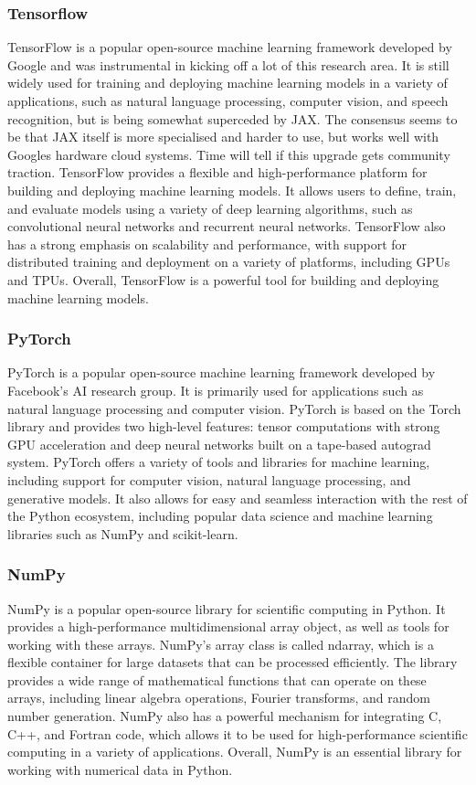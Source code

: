 \subsubsection{Tensorflow}
TensorFlow is a popular open-source machine learning framework developed by Google and was instrumental in kicking off a lot of this research area. It is still widely used for training and deploying machine learning models in a variety of applications, such as natural language processing, computer vision, and speech recognition, but is being somewhat superceded by JAX. The consensus seems to be that JAX itself is more specialised and harder to use, but works well with Googles hardware cloud systems. Time will tell if this upgrade gets community traction. TensorFlow provides a flexible and high-performance platform for building and deploying machine learning models. It allows users to define, train, and evaluate models using a variety of deep learning algorithms, such as convolutional neural networks and recurrent neural networks. TensorFlow also has a strong emphasis on scalability and performance, with support for distributed training and deployment on a variety of platforms, including GPUs and TPUs. Overall, TensorFlow is a powerful tool for building and deploying machine learning models.
\subsubsection{PyTorch}
PyTorch is a popular open-source machine learning framework developed by Facebook's AI research group. It is primarily used for applications such as natural language processing and computer vision. PyTorch is based on the Torch library and provides two high-level features: tensor computations with strong GPU acceleration and deep neural networks built on a tape-based autograd system. PyTorch offers a variety of tools and libraries for machine learning, including support for computer vision, natural language processing, and generative models. It also allows for easy and seamless interaction with the rest of the Python ecosystem, including popular data science and machine learning libraries such as NumPy and scikit-learn. 
\subsubsection{NumPy}
NumPy is a popular open-source library for scientific computing in Python. It provides a high-performance multidimensional array object, as well as tools for working with these arrays. NumPy's array class is called ndarray, which is a flexible container for large datasets that can be processed efficiently. The library provides a wide range of mathematical functions that can operate on these arrays, including linear algebra operations, Fourier transforms, and random number generation. NumPy also has a powerful mechanism for integrating C, C++, and Fortran code, which allows it to be used for high-performance scientific computing in a variety of applications. Overall, NumPy is an essential library for working with numerical data in Python.
